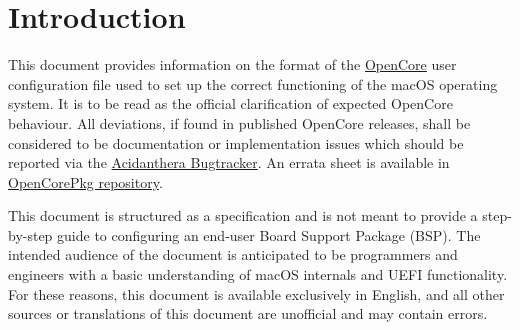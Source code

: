 \documentclass[]{article}
\makeatletter
\providecommand{\DIFaddtex}[1]{{\protect\color{blue}\uwave{#1}}} %
\providecommand{\DIFdeltex}[1]{{\protect\color{red}\sout{#1}}}                      %
\renewcommand{\label}[1]{%
\zref@wrapper@immediate{\oldlabel{#1}}}  %
\providecommand{\DIFaddbegin}{\global\booltrue{DIFkeeppage}\global\booltrue{DIFchange}} %
\providecommand{\DIFaddend}{\global\booltrue{DIFkeeppage}\global\boolfalse{DIFchange}} %
\providecommand{\DIFdelbegin}{\global\booltrue{DIFkeeppage}\global\booltrue{DIFchange}} %
\providecommand{\DIFdelend}{\global\booltrue{DIFkeeppage}\global\boolfalse{DIFchange}} %
\providecommand{\DIFadd}[1]{\texorpdfstring{\DIFaddtex{#1}}{#1}} %
\providecommand{\DIFdel}[1]{\texorpdfstring{\DIFdeltex{#1}}{}} %
\makeatother
\begin{document}

\tableofcontents

\section{Introduction}\label{introduction}

This document provides information on the format of the
\href{https://github.com/acidanthera/OpenCorePkg}{OpenCore} user
configuration file used to set up the correct functioning of the macOS
operating system. It is to be read as the official clarification of expected
OpenCore behaviour. All deviations, if found in published OpenCore releases,
shall be considered to be documentation or implementation issues which should be
reported via the \href{https://github.com/acidanthera/bugtracker}{Acidanthera Bugtracker}.
An errata sheet is available in
\href{https://github.com/acidanthera/OpenCorePkg/blob/master/Docs/Errata/Errata.pdf}{OpenCorePkg repository}.

This document is structured as a specification and is not meant to provide a step-by-step
guide to configuring an end-user Board Support Package (BSP). The intended audience
of the document is anticipated to be programmers and engineers with a basic understanding of macOS internals
and UEFI functionality. For these reasons, this document is available exclusively in English,
and all other sources or translations of this document are unofficial and may
contain errors.
\end{document}
